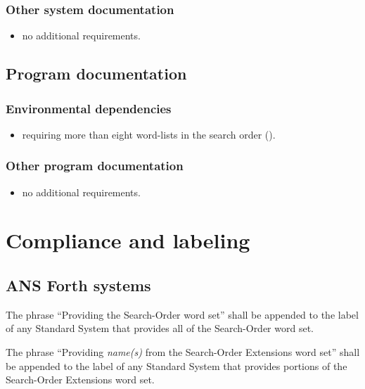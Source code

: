 \subsubsection{Other system documentation} %

\begin{itemize}
\item no additional requirements.
\end{itemize}

\subsection{Program documentation} %

\subsubsection{Environmental dependencies} %

\begin{itemize}
\item requiring more than eight word-lists in the search order
	().
\end{itemize}

\subsubsection{Other program documentation} %

\begin{itemize}
\item no additional requirements.
\end{itemize}


\section{Compliance and labeling} %

\subsection{ANS Forth systems} %

The phrase ``Providing the Search-Order word set'' shall be
appended to the label of any Standard System that provides all of
the Search-Order word set.

The phrase ``Providing \emph{name(s)} from the Search-Order
Extensions word set'' shall be appended to the label of any
Standard System that provides portions of the Search-Order
Extensions word set.

